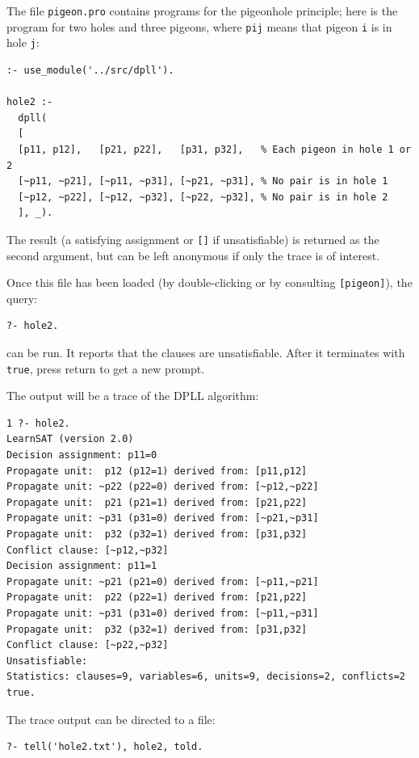 \documentclass[11pt]{article}
\newcommand*{\p}[1]{\textup{\texttt{#1}}}
\begin{document}
The file \p{pigeon.pro} contains programs for the pigeonhole principle; here is the program for two holes and three pigeons, where \p{pij} means that pigeon \p{i} is in hole \p{j}:

\begin{verbatim}
:- use_module('../src/dpll').

hole2 :-
  dpll(
  [
  [p11, p12],   [p21, p22],   [p31, p32],   % Each pigeon in hole 1 or 2 
  [~p11, ~p21], [~p11, ~p31], [~p21, ~p31], % No pair is in hole 1
  [~p12, ~p22], [~p12, ~p32], [~p22, ~p32], % No pair is in hole 2
  ], _).
\end{verbatim}

The result (a satisfying assignment or \p{[]} if unsatisfiable) is
returned as the second argument, but can be left anonymous if only
the trace is of interest.

Once this file has been loaded (by double-clicking or by consulting
\p{[pigeon]}), the query:
\begin{verbatim}
?- hole2. 
\end{verbatim}
can be run. It reports that the clauses are unsatisfiable. After it terminates with \p{true}, press return to get a new prompt.

\newpage

The output will be a trace of the DPLL algorithm:

\begin{verbatim}
1 ?- hole2.
LearnSAT (version 2.0)
Decision assignment: p11=0
Propagate unit:  p12 (p12=1) derived from: [p11,p12]
Propagate unit: ~p22 (p22=0) derived from: [~p12,~p22]
Propagate unit:  p21 (p21=1) derived from: [p21,p22]
Propagate unit: ~p31 (p31=0) derived from: [~p21,~p31]
Propagate unit:  p32 (p32=1) derived from: [p31,p32]
Conflict clause: [~p12,~p32]
Decision assignment: p11=1
Propagate unit: ~p21 (p21=0) derived from: [~p11,~p21]
Propagate unit:  p22 (p22=1) derived from: [p21,p22]
Propagate unit: ~p31 (p31=0) derived from: [~p11,~p31]
Propagate unit:  p32 (p32=1) derived from: [p31,p32]
Conflict clause: [~p22,~p32]
Unsatisfiable:
Statistics: clauses=9, variables=6, units=9, decisions=2, conflicts=2
true.
\end{verbatim}

The trace output can be directed to a file:

\begin{verbatim}
?- tell('hole2.txt'), hole2, told.
\end{verbatim}

\end{document}
